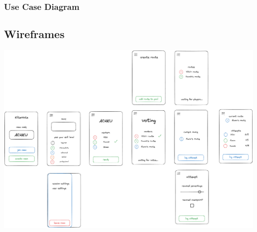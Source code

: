 \documentclass[11pt,a4paper,headsepline,footsepline,bibliography=totocnumbered]{article}
\begin{document}
\subsubsection{Use Case Diagram}

\subsection{Wireframes}
  \includegraphics[width=\textwidth]{pictures/KilterVote_GUI.png}
\end{document}
